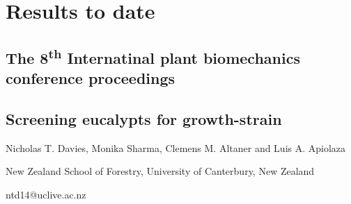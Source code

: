 \section{Results to date}
\subsection{ The 8\textsuperscript{th} Internatinal plant biomechanics conference proceedings}
\begin{center}
\subsection{Screening eucalypts for growth-strain}

Nicholas T. Davies, Monika Sharma, Clemens M. Altaner and Luis A. Apiolaza

New Zealand School of Forestry, University of Canterbury, New Zealand

ntd14@uclive.ac.nz  
\end{center}

